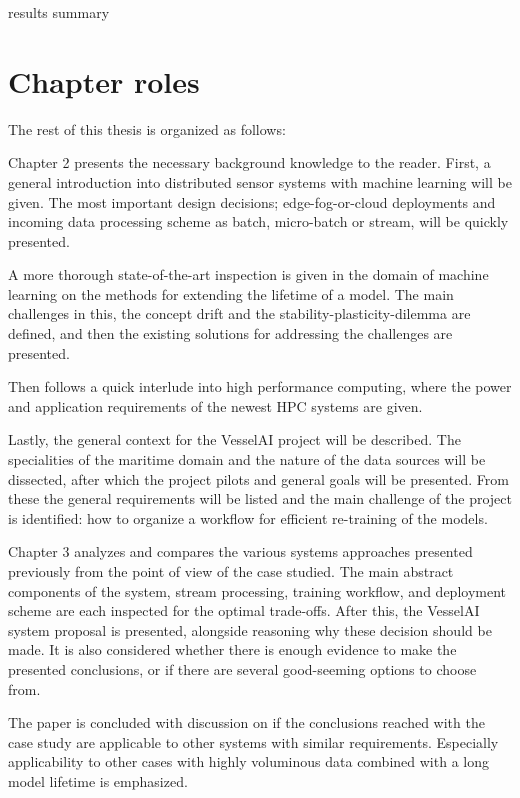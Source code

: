 results summary

\section{Chapter roles}

The rest of this thesis is organized as follows:

Chapter 2 presents the necessary background knowledge to the reader. First, a general introduction into distributed sensor systems with machine learning will be given. The most important design decisions; edge-fog-or-cloud deployments and incoming data processing scheme as batch, micro-batch or stream, will be quickly presented.

A more thorough state-of-the-art inspection is given in the domain of machine learning on the methods for extending the lifetime of a model. The main challenges in this, the concept drift and the stability-plasticity-dilemma are defined, and then the existing solutions for addressing the challenges are presented.

Then follows a quick interlude into high performance computing, where the power and application requirements of the newest HPC systems are given.

Lastly, the general context for the VesselAI project will be described. The specialities of the maritime domain and the nature of the data sources will be dissected, after which the project pilots and general goals will be presented. From these the general requirements will be listed and the main challenge of the project is identified: how to organize a workflow for efficient re-training of the models.

Chapter 3 analyzes and compares the various systems approaches presented previously from the point of view of the case studied. The main abstract components of the system, stream processing, training workflow, and deployment scheme are each inspected for the optimal trade-offs. After this, the VesselAI system proposal is presented, alongside reasoning why these decision should be made. It is also considered whether there is enough evidence to make the presented conclusions, or if there are several good-seeming options to choose from.

The paper is concluded with discussion on if the conclusions reached with the case study are applicable to other systems with similar requirements. Especially applicability to other cases with highly voluminous data combined with a long model lifetime is emphasized.

